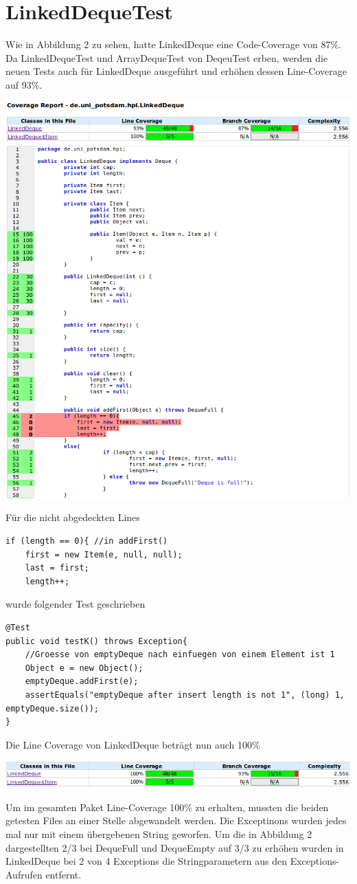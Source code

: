 \documentclass[a4paper,11pt]{scrartcl}
\begin{document}
\section{LinkedDequeTest}
Wie in Abbildung 2 zu sehen, hatte LinkedDeque eine Code-Coverage von 87\%. Da LinkedDequeTest und ArrayDequeTest von DeqeuTest erben, werden die neuen Tests auch für LinkedDeque ausgeführt und erhöhen dessen Line-Coverage auf 93\%.
\begin{center}
\includegraphics[scale=0.45]{linkeddeque}
\end{center}
Für die nicht abgedeckten Lines
\begin{lstlisting}
if (length == 0){ //in addFirst()
	first = new Item(e, null, null);
	last = first;
	length++;
\end{lstlisting}
wurde folgender Test geschrieben
\begin{lstlisting}
@Test 
public void testK() throws Exception{
    //Groesse von emptyDeque nach einfuegen von einem Element ist 1
	Object e = new Object();
    emptyDeque.addFirst(e);
    assertEquals("emptyDeque after insert length is not 1", (long) 1, emptyDeque.size());
}
\end{lstlisting}
Die Line Coverage von LinkedDeque beträgt nun auch 100\%
\begin{center}
\includegraphics[scale=0.5]{LinkedDeque100}
\end{center}
Um im gesamten Paket Line-Coverage 100\% zu erhalten, mussten die beiden getesten Files an einer Stelle abgewandelt werden. Die Exceptinons wurden jedes mal nur mit einem übergebenen String geworfen. Um die in Abbildung 2 dargestellten 2/3 bei DequeFull und DequeEmpty auf 3/3 zu erhöhen wurden in LinkedDeque bei 2 von 4 Exceptions die Stringparametern aus den Exceptions-Aufrufen entfernt.
\end{document}
